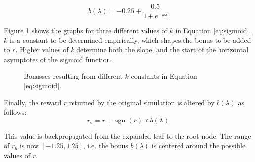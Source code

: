 \documentclass{ecai2010}
\newcommand{\sgn}{\mathop{\mathrm{sgn}}}
\begin{document}
\begin{equation}
b(\lambda) = -0.25 + \frac{0.5}{1+e^{-k\lambda}}
\label{eq:sigmoid}
\end{equation}

Figure \ref{fig:sigmoids} shows the graphs for three different values of $k$ in Equation \ref{eq:sigmoid}. $k$ is a constant to be determined empirically, which shapes the bonus to be added to $r$. Higher values of $k$ determine both the slope, and the start of the horizontal asymptotes of the sigmoid function.

\begin{figure}[t]
\centering
{}
    \caption{Bonusses resulting from different $k$ constants in Equation \ref{eq:sigmoid}.}
	\label{fig:sigmoids}
\end{figure}

Finally, the reward $r$ returned by the original simulation is altered by $b(\lambda)$ as follows:
\begin{equation}
r_b = r + \sgn(r) \times b(\lambda)
\end{equation}

This value is backpropagated from the expanded leaf to the root node. The range of $r_b$ is now $[-1.25, 1.25]$, i.e. the bonus $b(\lambda)$ is centered around the possible values of $r$.
\end{document}
